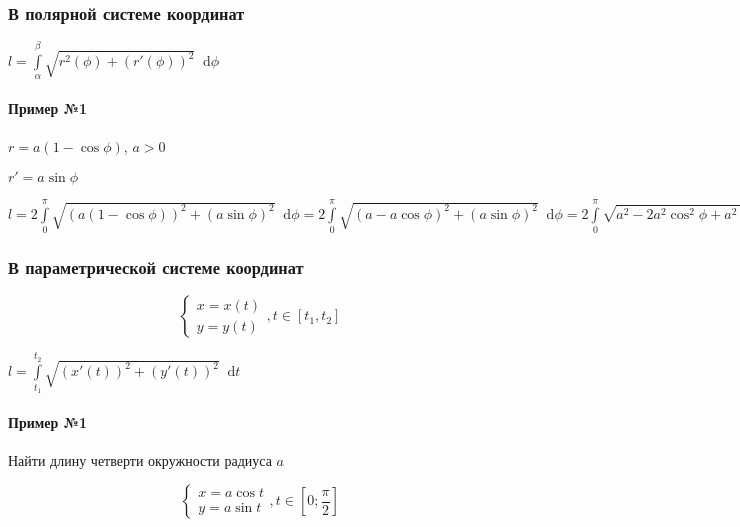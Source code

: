 \documentclass{article}
\newcommand*\diff{\mathop{}\!\mathrm{d}}
\begin{document}
\subsubsection{В полярной системе координат}

$l = \int\limits_{\alpha}^{\beta} \sqrt{r^2 (\phi) + (r'(\phi))^2} \diff \phi$

\paragraph{Пример №1}

$r = a (1 - \cos \phi)$, $a > 0$

$r' = a \sin \phi$

$l = 2 \int\limits_{0}^{\pi} \sqrt{(a (1 - \cos \phi))^2 + (a \sin \phi)^2} \diff \phi = 2 \int\limits_{0}^{\pi} \sqrt{(a - a \cos \phi)^2 + (a \sin \phi)^2} \diff \phi = 2 \int\limits_{0}^{\pi} \sqrt{a^2 - 2a^2 \cos^2 \phi + a^2 \sin^2 \phi} \diff \phi = 2 \int\limits_{0}^{\pi} \sqrt{a^2 ( 1 - 2\cos \phi + \cos^2 \phi + \sin^2 \phi ) } \diff \phi = 2a \int\limits_{0}^{\pi} \sqrt{2 - 2 \cos \phi } \diff \phi = 2 a \int\limits_{0}^{\pi} \sqrt{4 (\frac{1 - \cos \phi}{2})} \diff \phi = 4 a \int \limits_{0}^{\pi} \sqrt{\sin^2 \frac{\phi}{2}} \diff \phi = 4 a \int\limits_{0}^{\pi} \sin \frac{\phi}{2} \diff \phi = 4 a ( - 2 \cos \frac{\phi}{2} ) \bigg|_{0}^{\pi} = 4 a ( - (-2)) = 8 agith$

\subsubsection{В параметрической системе координат}

\begin{equation}
\begin{cases}
    x = x(t) \\
    y = y(t)
\end{cases}, t \in [t_1, t_2]
\end{equation}

$l = \int\limits_{t_1}^{t_2} \sqrt{(x'(t))^2 + (y'(t))^2} \diff t$

\paragraph{Пример №1}

Найти длину четверти окружности радиуса $a$

\begin{equation}
    \begin{cases}
        x = a \cos t \\
        y = a \sin t
    \end{cases}, t \in [0; \frac{\pi}{2}]
\end{equation}
\end{document}

